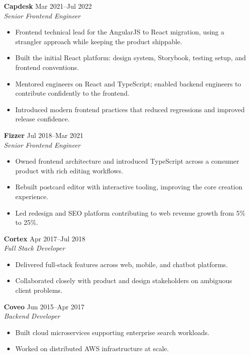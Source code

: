 \documentclass[11pt]{article}
\begin{document}
\textbf{Capdesk} \hfill Mar 2021--Jul 2022\\
\textit{Senior Frontend Engineer}
\begin{itemize}
    \item Frontend technical lead for the AngularJS to React migration, using a strangler approach while keeping the product shippable.
    \item Built the initial React platform: design system, Storybook, testing setup, and frontend conventions.
    \item Mentored engineers on React and TypeScript; enabled backend engineers to contribute confidently to the frontend.
    \item Introduced modern frontend practices that reduced regressions and improved release confidence.
\end{itemize}

\textbf{Fizzer} \hfill Jul 2018--Mar 2021\\
\textit{Senior Frontend Engineer}
\begin{itemize}
    \item Owned frontend architecture and introduced TypeScript across a consumer product with rich editing workflows.
    \item Rebuilt postcard editor with interactive tooling, improving the core creation experience.
    \item Led redesign and SEO platform contributing to web revenue growth from 5\% to 25\%.
\end{itemize}

\textbf{Cortex} \hfill Apr 2017--Jul 2018\\
\textit{Full Stack Developer}
\begin{itemize}
    \item Delivered full-stack features across web, mobile, and chatbot platforms.
    \item Collaborated closely with product and design stakeholders on ambiguous client problems.
\end{itemize}

\textbf{Coveo} \hfill Jun 2015--Apr 2017\\
\textit{Backend Developer}
\begin{itemize}
    \item Built cloud microservices supporting enterprise search workloads.
    \item Worked on distributed AWS infrastructure at scale.
\end{itemize}
\end{document}

